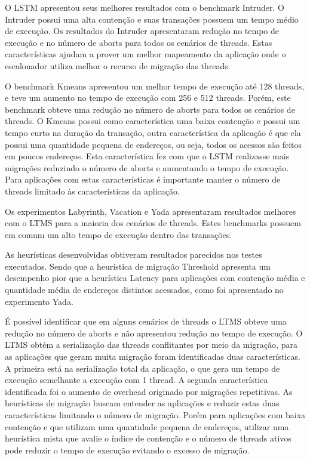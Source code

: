 \documentclass[diss,capa]{texufpel}
\begin{document}
O LSTM apresentou seus melhores resultados com o benchmark Intruder. O Intruder possui uma alta contenção e suas transações possuem um tempo médio de execução. Os resultados do Intruder apresentaram redução no tempo de execução e no número de aborts para todos os cenários de threads. Estas características ajudam a prover um melhor mapeamento da aplicação onde o escalonador utiliza melhor o recurso de migração das threads.

O benchmark Kmeans apresentou um melhor tempo de execução até 128 threads, e teve um aumento no tempo de execução com 256 e 512 threads. Porém, este benchmark obteve uma redução no número de aborts para todos os cenários de threads. O Kmeans possui como característica uma baixa contenção e possui um tempo curto na duração da transação, outra característica da aplicação é que ela possui uma quantidade pequena de endereços, ou seja, todos os acessos são feitos em poucos endereços. Esta característica fez com que o LSTM realizasse mais migrações reduzindo o número de aborts e aumentando o tempo de execução. Para aplicações com estas características é importante manter o número de threads limitado às características da aplicação.

Os experimentos Labyrinth, Vacation e Yada apresentaram resultados melhores com o LTMS para a maioria dos cenários de threads. Estes benchmarks possuem em comum um alto tempo de execução dentro das transações.

As heurísticas desenvolvidas obtiveram resultados parecidos nos testes executados. Sendo que a heurística de migração Threshold apresenta um desempenho pior que a heurística Latency para aplicações com contenção média e quantidade média de endereços distintos acessados, como foi apresentado no experimento Yada.

É possível identificar que em alguns cenários de threads o LTMS obteve uma redução no número de aborts e não apresentou redução no tempo de execução. O LTMS obtém a serialização das threads conflitantes por meio da migração, para as aplicações que geram muita migração foram identificadas duas características. A primeira está na serialização total da aplicação, o que gera um tempo de execução semelhante a execução com 1 thread. A segunda característica identificada foi o aumento de overhead originado por migrações repetitivas. As heurísticas de migração buscam entender as aplicações e reduzir estas duas características limitando o número de migração. Porém para aplicações com baixa contenção e que utilizam uma quantidade pequena de endereços, utilizar uma heurística mista que avalie o índice de contenção e o número de threads ativos pode reduzir o tempo de execução evitando o excesso de migração.
\end{document}
